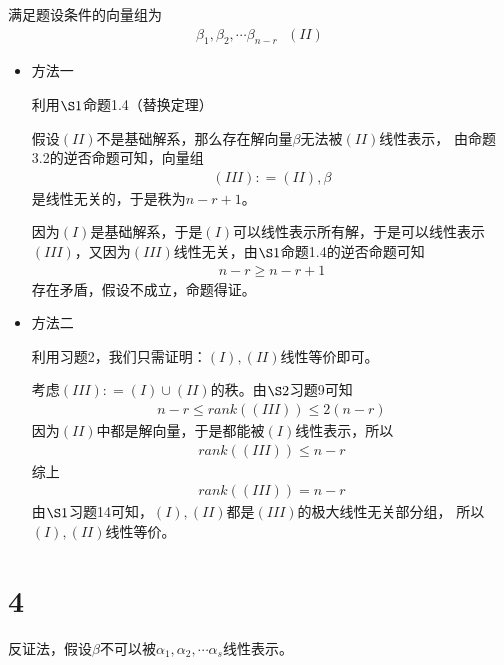 \documentclass{article}
\begin{document}
满足题设条件的向量组为
\begin{align*}
  \beta_1, \beta_2, \cdots \beta_{n - r} \ \ \ (II)
\end{align*}

\begin{itemize}
  \item 方法一

        利用$\S 1$命题1.4（替换定理）

        假设$(II)$不是基础解系，那么存在解向量$\beta$无法被$(II)$线性表示，
        由命题3.2的逆否命题可知，向量组
        \begin{align*}
          (III) : = (II), \beta
        \end{align*}
        是线性无关的，于是秩为$n - r + 1$。

        因为$(I)$是基础解系，于是$(I)$可以线性表示所有解，于是可以线性表示
        $(III)$，又因为$(III)$线性无关，由$\S 1$命题1.4的逆否命题可知
        \begin{align*}
          n - r \geq n - r + 1
        \end{align*}
        存在矛盾，假设不成立，命题得证。

  \item 方法二

        利用习题2，我们只需证明：$(I), (II)$线性等价即可。

        考虑$(III) : = (I) \cup (II)$的秩。由$\S 2$习题9可知
        \begin{align*}
          n - r \leq rank((III)) \leq 2(n - r)
        \end{align*}
        因为$(II)$中都是解向量，于是都能被$(I)$线性表示，所以
        \begin{align*}
          rank((III)) \leq n - r
        \end{align*}
        综上
        \begin{align*}
          rank((III)) = n - r
        \end{align*}
        由$\S1$习题14可知，$(I),(II)$都是$(III)$的极大线性无关部分组，
        所以$(I), (II)$线性等价。
\end{itemize}

\section*{4}

反证法，假设$\beta$不可以被$\alpha_1, \alpha_2, \cdots \alpha_{s}$线性表示。
\end{document}
